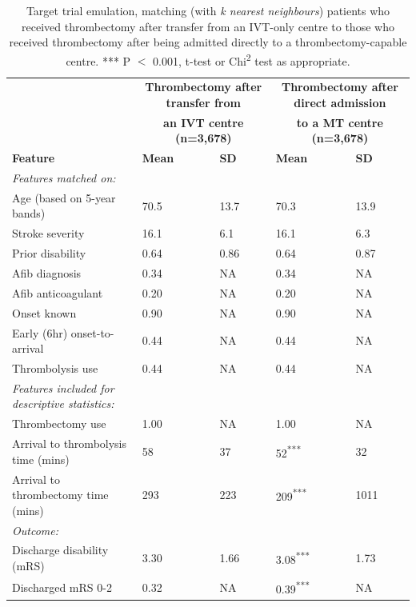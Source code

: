 \begingroup
\footnotesize
\begin{longtable}[]{@{}lllll@{}}
\caption{Target trial emulation, matching (with \textit{k nearest neighbours}) patients who received thrombectomy after transfer from an IVT-only centre to those who received thrombectomy after being admitted directly to a thrombectomy-capable centre. *** P $<$ 0.001, t-test or Chi\textsuperscript{2} test as appropriate.}\\
\toprule
& \multicolumn{2}{c}{\textbf{Thrombectomy after transfer from}} & \multicolumn{2}{c}{\textbf{Thrombectomy after direct admission}} \\
& \multicolumn{2}{c}{\textbf{an IVT centre (n=3,678)}} & \multicolumn{2}{c}{\textbf{to a MT centre (n=3,678)}} \\
\textbf{Feature} & \textbf{Mean} & \textbf{SD} & \textbf{Mean} & \textbf{SD} \\
\midrule
\endhead
\bottomrule
\endlastfoot
\textit{Features matched on:} \\
Age (based on 5-year bands) & 70.5 & 13.7 & 70.3 & 13.9 \\
Stroke severity & 16.1 & 6.1 & 16.1 & 6.3 \\
Prior disability & 0.64 & 0.86 & 0.64 & 0.87 \\
Afib diagnosis & 0.34 & NA & 0.34 & NA \\
Afib anticoagulant & 0.20 & NA & 0.20 & NA \\
Onset known & 0.90 & NA & 0.90 & NA \\
Early (6hr) onset-to-arrival & 0.44 & NA & 0.44 & NA \\
Thrombolysis use & 0.44 & NA & 0.44 & NA \\
\midrule
\textit{Features included for descriptive statistics:}\\
Thrombectomy use & 1.00 & NA & 1.00 & NA \\
Arrival to thrombolysis time (mins) & 58 & 37 & 52\textsuperscript{***} & 32 \\
Arrival to thrombectomy time (mins) & 293 & 223 & 209\textsuperscript{***} & 1011 \\
\midrule
\textit{Outcome:}\\
Discharge disability (mRS) & 3.30 & 1.66 & 3.08\textsuperscript{***} & 1.73 \\
Discharged mRS 0-2 & 0.32 & NA & 0.39\textsuperscript{***} & NA \\
\end{longtable}
\endgroup

